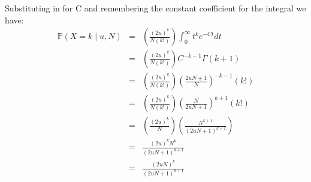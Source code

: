 \documentclass[11pt]{article}
\renewcommand{\Pr}{\mathbb{P}}
\begin{document}
Substituting in for C and remembering the constant coefficient for the integral we have:
\begin{eqnarray*}
\Pr(X=k \mid u, N) & = & \left(\frac{(2u)^k}{N(k!)}\right) \int_{0}^{\infty}  t^ke^{-C t} dt \\
 & = & \left(\frac{(2u)^k}{N(k!)}\right)C^{-k-1}\Gamma(k+1) \\
 & = & \left(\frac{(2u)^k}{N(k!)}\right)\left(\frac{2uN + 1}{N}\right)^{-k-1}\left(k!\right) \\
 & = & \left(\frac{(2u)^k}{N(k!)}\right)\left(\frac{N}{2uN + 1}\right)^{k+1}\left(k!\right) \\
 & = & \left(\frac{(2u)^k}{N}\right)\left(\frac{N^{k+1}}{(2uN + 1)^{k+1}}\right)\\
 & = & \frac{(2u)^k N^k}{(2uN + 1)^{k+1}} \\
 & = & \frac{(2uN)^k}{(2uN + 1)^{k+1}} \\
\end{eqnarray*}\
\end{document}
